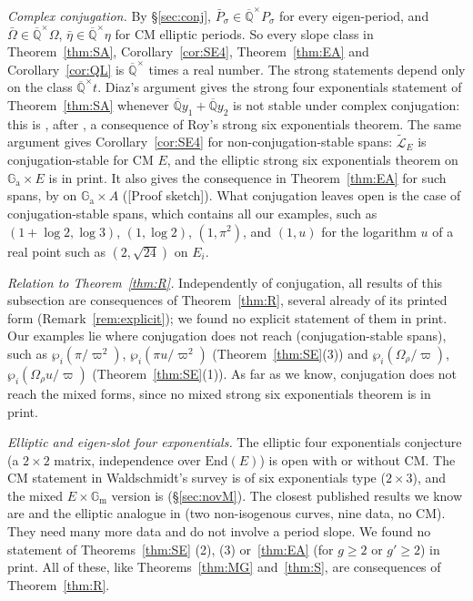 \documentclass[11pt]{amsart}
\theoremstyle{definition}
\newcommand{\Qb}{\overline{\mathbb{Q}}}
\newcommand{\Ga}{\mathbb{G}_{\mathrm a}}
\newcommand{\Gm}{\mathbb{G}_{\mathrm m}}
\newcommand{\Lt}{\widetilde{\mathcal{L}}}
\newcommand{\vp}{\varpi}
\newcommand{\lab}[1]{\textup{[#1]}}
\begin{document}
\emph{Complex conjugation.} By \S\ref{sec:conj}, $\bar P_\sigma\in\Qb^\times P_\sigma$ for every eigen-period, and
$\bar\Omega\in\Qb^\times\Omega$, $\bar\eta\in\Qb^\times\eta$ for CM elliptic periods. So every slope class in
Theorem~\ref{thm:SA}, Corollary~\ref{cor:SE4}, Theorem~\ref{thm:EA} and Corollary~\ref{cor:QL} is $\Qb^\times$ times a real
number. The strong statements depend only on the class $\Qb^\times t$. Diaz's argument gives the strong four exponentials
statement of Theorem~\ref{thm:SA} whenever $\Qb y_1+\Qb y_2$ is not stable under complex conjugation: this is
\cite[Thm.~4.1]{W07}, after \cite{Di04}, a consequence of Roy's strong six exponentials theorem. The same argument gives
Corollary~\ref{cor:SE4} for non-conjugation-stable spans: $\Lt_E$ is conjugation-stable for CM $E$, and the elliptic strong
six exponentials theorem \cite[Cor.~1]{RW93} on $\Ga\times E$ is in print. It also gives the consequence in
Theorem~\ref{thm:EA} for such spans, by \cite[Cor.~1]{RW93} on $\Ga\times A$ (\lab{Proof sketch}). What conjugation leaves
open is the case of conjugation-stable spans, which contains all our examples, such as $(1+\log2,\log3)$, $(1,\log2)$,
$(1,\pi^2)$, and $(1,u)$ for the logarithm $u$ of a real point such as $(2,\sqrt{24})$ on $E_i$.

\emph{Relation to Theorem~\ref{thm:R}.} Independently of conjugation, all results of this subsection are consequences
of Theorem~\ref{thm:R}, several already of its printed form (Remark~\ref{rem:explicit}); we found no explicit statement of
them in print. Our examples lie where conjugation does not reach (conjugation-stable spans), such as $\wp_i(\pi/\vp^2)$,
$\wp_i(\pi u/\vp^2)$ (Theorem~\ref{thm:SE}(3)) and $\wp_i(\Omega_\rho/\vp)$, $\wp_i(\Omega_\rho u/\vp)$
(Theorem~\ref{thm:SE}(1)). As far as we know, conjugation does not reach the mixed forms, since no mixed strong six
exponentials theorem is in print.

\emph{Elliptic and eigen-slot four exponentials.} The elliptic four exponentials conjecture (a $2\times2$ matrix,
independence over $\mathrm{End}(E)$) is open with or without CM. The CM statement in Waldschmidt's survey \cite{W06} is of
six exponentials type ($2\times3$), and the mixed $E\times\Gm$ version is \cite[Conj.~42]{W06} (\S\ref{sec:novM}). The
closest published results we know are \cite[Thms.~4.2, 4.3]{W05} and the elliptic analogue in \cite{W03s} (two
non-isogenous curves, nine data, no CM). They need many more data and do not involve a period slope. We found no statement
of Theorems~\ref{thm:SE} (2), (3) or~\ref{thm:EA} (for $g\ge2$ or $g'\ge2$) in print. All of these, like
Theorems~\ref{thm:MG} and~\ref{thm:S}, are consequences of Theorem~\ref{thm:R}.
\end{document}
